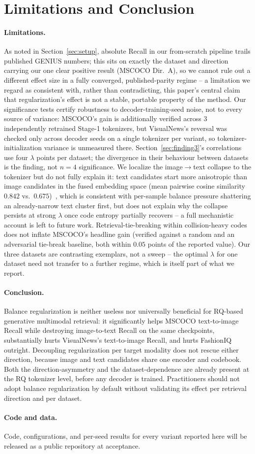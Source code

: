 \section{Limitations and Conclusion}
\label{sec:limitations}

\paragraph{Limitations.} As noted in Section~\ref{sec:setup}, absolute Recall in our from-scratch pipeline trails published GENIUS numbers; this sits on exactly the dataset and direction carrying our one clear positive result (MSCOCO Dir.\ A), so we cannot rule out a different effect size in a fully converged, published-parity regime -- a limitation we regard as consistent with, rather than contradicting, this paper's central claim that regularization's effect is not a stable, portable property of the method. Our significance tests certify robustness to decoder-training-seed noise, not to every source of variance: MSCOCO's gain is additionally verified across 3 independently retrained Stage-1 tokenizers, but VisualNews's reversal was checked only across decoder seeds on a single tokenizer per variant, so tokenizer-initialization variance is unmeasured there. Section~\ref{sec:finding3}'s correlations use four $\lambda$ points per dataset; the divergence in their behaviour between datasets is the finding, not $n{=}4$ significance. We localize the image$\to$text collapse to the tokenizer but do not fully explain it: text candidates start more anisotropic than image candidates in the fused embedding space (mean pairwise cosine similarity $0.842$ vs.\ $0.675$)~\cite{ethayarajh2019anisotropy}, which is consistent with per-sample balance pressure shattering an already-narrow text cluster first, but does not explain why the collapse persists at strong $\lambda$ once code entropy partially recovers -- a full mechanistic account is left to future work. Retrieval-tie-breaking within collision-heavy codes does not inflate MSCOCO's headline gain (verified against a random and an adversarial tie-break baseline, both within $0.05$ points of the reported value). Our three datasets are contrasting exemplars, not a sweep -- the optimal $\lambda$ for one dataset need not transfer to a further regime, which is itself part of what we report.

\paragraph{Conclusion.} Balance regularization is neither useless nor universally beneficial for RQ-based generative multimodal retrieval: it significantly helps MSCOCO text-to-image Recall while destroying image-to-text Recall on the same checkpoints, substantially hurts VisualNews's text-to-image Recall, and hurts FashionIQ outright. Decoupling regularization per target modality does not rescue either direction, because image and text candidates share one encoder and codebook. Both the direction-asymmetry and the dataset-dependence are already present at the RQ tokenizer level, before any decoder is trained. Practitioners should not adopt balance regularization by default without validating its effect per retrieval direction and per dataset.

\paragraph{Code and data.} Code, configurations, and per-seed results for every variant reported here will be released as a public repository at acceptance.
